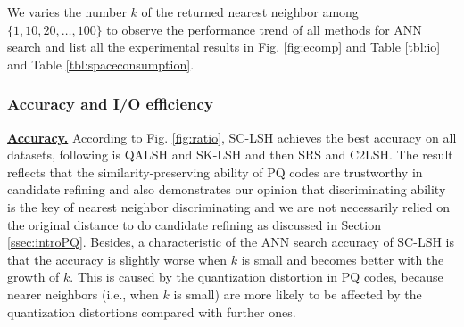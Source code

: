 \documentclass[twocolumn]{svjour3}          %
\newcommand{\btitle}[1]{\vspace{1ex}\noindent\underline{\textbf{#1}}}
\begin{document}
We varies the number $k$ of the returned nearest neighbor among $\{1,10,20,\ldots,100\}$ to observe the performance trend of all methods for ANN search and list all the experimental results in Fig. \ref{fig:ecomp} and Table \ref{tbl:io} and Table \ref{tbl:spaceconsumption}.

\subsubsection{Accuracy and I/O efficiency}
\noindent\btitle{Accuracy.} According to Fig. \ref{fig:ratio}, SC-LSH achieves the best accuracy on all datasets, following is QALSH and SK-LSH and then SRS and C2LSH.
The result reflects that the similarity-preserving ability of PQ codes are trustworthy in candidate refining and also demonstrates our opinion that discriminating ability is the key of nearest neighbor discriminating and we are not necessarily relied on the original distance to do candidate refining as discussed in Section \ref{ssec:introPQ}.
Besides, a characteristic of the ANN search accuracy of SC-LSH is that the accuracy is slightly worse when $k$ is small and becomes better with the growth of $k$. This is caused by the quantization distortion in PQ codes, because nearer neighbors (i.e., when $k$ is small) are more likely to be affected by the quantization distortions compared with further ones.
\begin{figure*}[t]
\begin{center}
\end{center}
\caption{Experimental comparisons}
\label{fig:ecomp}
\end{figure*}
\end{document}
